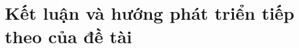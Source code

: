 \documentclass[12pt,a4paper,reqno, oneside]{book}
\begin{document}
%
%
%
%


\newpage
\pagestyle{fancy}
\setcounter{chapter}{3}
\chapter{Kết luận và hướng phát triển tiếp theo của đề tài}

	
	
\end{document}
